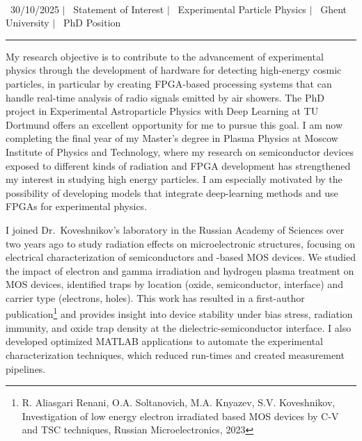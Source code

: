 \documentclass[a4paper,12pt]{article}
\begin{document}
\begin{center}
    {\Huge \scshape {\fontsize{25}{30}\selectfont{Reza}} {\fontsize{25}{30}}} \\ \vspace{3pt}
    {\small \raisebox{-0.2\height}\ {30/10/2025}} $|$
    {\small \raisebox{-0.2\height}\ {Statement of Interest}} $|$
    {\small \raisebox{-0.2\height}\ {Experimental Particle Physics}} $|$
    {\small \raisebox{-0.2\height}\ {Ghent University}} $|$
    {\small \raisebox{-0.2\height}\ {PhD Position}}
    \vspace{-10pt}
\end{center}
\vspace{-10pt}
\noindent\rule{\textwidth}{0.5pt}

My research objective is to contribute to the advancement of experimental physics through the development of hardware for detecting high-energy cosmic particles, in particular by creating FPGA-based processing systems that can handle real-time analysis of radio signals emitted by air showers. The PhD project in Experimental Astroparticle Physics with Deep Learning at TU Dortmund offers an excellent opportunity for me to pursue this goal. I am now completing the final year of my Master’s degree in Plasma Physics at Moscow Institute of Physics and Technology, where my research on semiconductor devices exposed to different kinds of radiation and FPGA development has strengthened my interest in studying high energy particles. I am especially motivated by the possibility of developing models that integrate deep-learning methods and use FPGAs for experimental physics.

\vspace{10pt}
I joined Dr.\ Koveshnikov's laboratory in the Russian Academy of Sciences over two years ago to study radiation effects on microelectronic structures, focusing on electrical characterization of semiconductors and -based MOS devices. We studied the impact of electron and gamma irradiation and hydrogen plasma treatment on MOS devices, identified traps by location (oxide, semiconductor, interface) and carrier type (electrons, holes). This work has resulted in a first-author publication\footnote{R. Aliasgari Renani, O.A. Soltanovich, M.A. Knyazev, S.V. Koveshnikov, Investigation of low energy electron irradiated  based MOS devices by C-V and TSC techniques, Russian Microelectronics, 2023} and provides insight into device stability under bias stress, radiation immunity, and oxide trap density at the dielectric-semiconductor interface. I also developed optimized MATLAB applications to automate the experimental characterization techniques, which reduced run-times and created measurement pipelines. 
\end{document}
